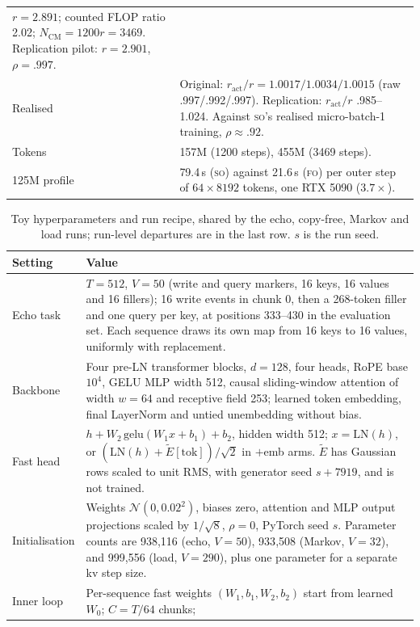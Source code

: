 \documentclass[11pt]{article}
\newcommand{\FO}{\textsc{fo}}
\newcommand{\SO}{\textsc{so}}
\begin{document}
\begin{table}[!htbp]
\begin{tabular}{@{}L{2.6cm}L{10.9cm}@{}}
$r=2.891$; counted FLOP ratio 2.02; $N_{\text{CM}}=1200r=3469$. Replication pilot: $r=2.901$,
$\rho=.997$. \\
Realised & Original: $r_{\text{act}}/r=1.0017/1.0034/1.0015$ (raw .997/.992/.997). Replication:
$r_{\text{act}}/r$ .985--1.024. Against \SO's realised micro-batch-1 training, $\rho\approx.92$. \\
Tokens & 157M (1200 steps), 455M (3469 steps). \\
125M profile & 79.4\,s (\SO) against 21.6\,s (\FO) per outer step of $64\times8192$ tokens, one RTX 5090
($3.7\times$). \\
\bottomrule
\end{tabular}
\end{table}

\begin{table}[!htbp]
\centering
\caption{Toy hyperparameters and run recipe, shared by the echo, copy-free, Markov and load runs;
run-level departures are in the last row. $s$ is the run seed.}
\label{tab:toy-hparams}
\scriptsize
\begin{tabular}{@{}L{2.7cm}L{10.7cm}@{}}
\toprule
Setting & Value \\
\midrule
Echo task & $T=512$, $V=50$ (write and query markers, 16 keys, 16 values and 16 fillers); 16 write events
in chunk 0, then a 268-token filler and one query per key, at positions 333--430 in the evaluation set.
Each sequence draws its own map from 16 keys to 16 values, uniformly with replacement. \\
Backbone & Four pre-LN transformer blocks, $d=128$, four heads, RoPE base $10^4$, GELU MLP width 512,
causal sliding-window attention of width $w=64$ and receptive field 253; learned token embedding,
final LayerNorm and untied unembedding without bias. \\
Fast head & $h+W_2\,\mathrm{gelu}(W_1x+b_1)+b_2$, hidden width 512; $x=\mathrm{LN}(h)$, or
$(\mathrm{LN}(h)+\tilde E[\mathrm{tok}])/\sqrt2$ in $+$emb arms. $\tilde E$ has Gaussian rows scaled to
unit RMS, with generator seed $s+7919$, and is not trained. \\
Initialisation & Weights $\mathcal N(0,0.02^2)$, biases zero, attention and MLP output projections
scaled by $1/\sqrt8$, $\rho=0$, PyTorch seed $s$. Parameter counts are 938{,}116 (echo, $V=50$),
933{,}508 (Markov, $V=32$), and 999{,}556 (load, $V=290$), plus one parameter for a separate kv step
size. \\
Inner loop & Per-sequence fast weights $(W_1,b_1,W_2,b_2)$ start from learned $W_0$; $C=T/64$ chunks;

\end{tabular}
\end{table}
\end{document}
